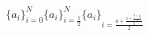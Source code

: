 \documentclass{jsarticle}
\begin{document}
\[
  \{a_i\}_{i=0}^N
  \{a_i\}_{\displaystyle i=\frac12}^N
  \{a_i\}_{\displaystyle i=\frac{a+\frac{1+\frac{2+\frac14}4}5}2}
\]
\end{document}
